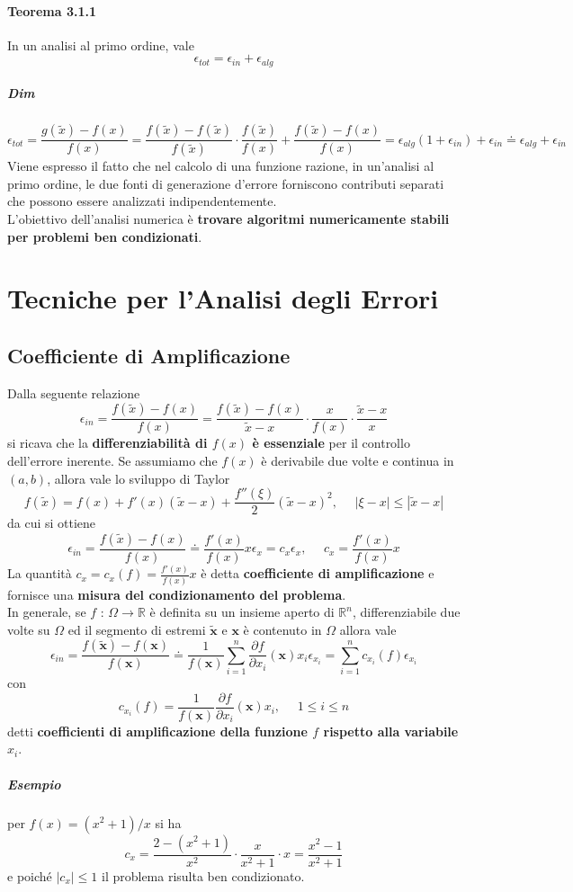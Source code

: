 \documentclass[10pt]{book}
\begin{document}
\paragraph{Teorema 3.1.1} In un analisi al primo ordine, vale $$\epsilon_{tot} = \epsilon_{in} + \epsilon_{alg}$$
\subparagraph{Dim} $$\epsilon_{tot} = \frac{g(\tilde{x}) - f(x)}{f(x)} = \frac{f(\tilde{x}) - f(\tilde{x})}{f(\tilde{x})}\cdot\frac{f(\tilde{x})}{f(x)} + \frac{f(\tilde{x}) - f(x)}{f(x)} = \epsilon_{alg}(1 + \epsilon_{in}) + \epsilon_{in} \doteq \epsilon_{alg} + \epsilon_{in}$$
Viene espresso il fatto che nel calcolo di una funzione razione, in un'analisi al primo ordine, le due fonti di generazione d'errore forniscono contributi separati che possono essere analizzati indipendentemente.\\
L'obiettivo dell'analisi numerica è \textbf{trovare algoritmi numericamente stabili per problemi ben condizionati}.
\section{Tecniche per l'Analisi degli Errori}
\subsection{Coefficiente di Amplificazione}
Dalla seguente relazione $$\epsilon_{in} = \frac{f(\tilde{x}) - f(x)}{f(x)} = \frac{f(\tilde{x}) - f(x)}{\tilde{x} - x}\cdot\frac{x}{f(x)}\cdot\frac{\tilde{x} - x}{x}$$ si ricava che la \textbf{differenziabilità di $f(x)$ è essenziale} per il controllo dell'errore inerente. Se assumiamo che $f(x)$ è derivabile due volte e continua in $(a, b)$, allora vale lo sviluppo di Taylor $$f(\tilde{x}) = f(x) + f'(x)(\tilde{x} - x) + \frac{f''(\xi)}{2}(\tilde{x} - x)^2,\:\:\:\:\:\:|\xi - x| \leq |\tilde{x} - x| $$ da cui si ottiene $$ \epsilon_{in} = \frac{f(\tilde{x}) - f(x)}{f(x)} \doteq \frac{f'(x)}{f(x)}x\epsilon_x = c_x\epsilon_x,\:\:\:\:\:\:c_x = \frac{f'(x)}{f(x)}x $$
La quantità $c_x = c_x(f) = \frac{f'(x)}{f(x)}x$ è detta \textbf{coefficiente di amplificazione} e fornisce una \textbf{misura del condizionamento del problema}.\\
In generale, se $f$ : $\Omega \rightarrow \mathbb{R}$ è definita su un insieme aperto di $\mathbb{R}^n$, differenziabile due volte su $\Omega$ ed il segmento di estremi $\tilde{\textbf{x}}$ e $\textbf{x}$ è contenuto in $\Omega$ allora vale
$$ \epsilon_{in} = \frac{f(\tilde{\textbf{x}}) - f(\textbf{x})}{f(\textbf{x})} \doteq \frac{1}{f(\textbf{x})}\sum_{i=1}^n \frac{\partial f}{\partial x_i}(\textbf{x})x_i\epsilon_{x_i} = \sum_{i=1}^n c_{x_i}(f)\epsilon_{x_i}$$
con $$c_{x_i}(f) = \frac{1}{f(\textbf{x})}\frac{\partial f}{\partial x_i}(\textbf{x})x_i,\:\:\:\:\:\:1 \leq i \leq n$$
detti \textbf{coefficienti di amplificazione della funzione $f$ rispetto alla variabile $x_i$}.
\subparagraph{Esempio} per $f(x) = (x^2 + 1)/x$ si ha $$c_x = \frac{2 - (x^2 + 1)}{x^2}\cdot \frac{x}{x^2 + 1}\cdot x = \frac{x^2 - 1}{x^2 + 1}$$ e poiché $|c_x| \leq 1$ il problema risulta ben condizionato.
\end{document}
